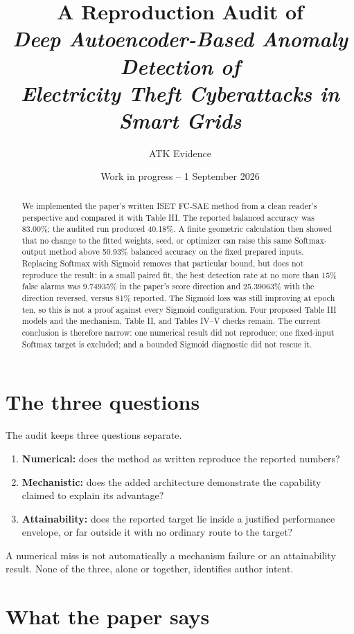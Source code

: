 \documentclass[11pt]{article}
\title{A Reproduction Audit of\\
\emph{Deep Autoencoder-Based Anomaly Detection of\\
Electricity Theft Cyberattacks in Smart Grids}}
\author{ATK Evidence}
\date{Work in progress -- 1 September 2026}
\begin{document}
\maketitle

\begin{abstract}
We implemented the paper's written ISET FC-SAE method from a clean reader's
perspective and compared it with Table III. The reported balanced accuracy was
83.00\%; the audited run produced 40.18\%. A finite geometric calculation then
showed that no change to the fitted weights, seed, or optimizer can raise this
same Softmax-output method above 50.93\% balanced accuracy on the fixed prepared
inputs. Replacing Softmax with Sigmoid removes that particular bound, but does
not reproduce the result: in a small paired fit, the best detection rate at no
more than 15\% false alarms was 9.74935\% in the paper's score direction and
25.39063\% with the direction reversed, versus 81\% reported. The Sigmoid loss
was still improving at epoch ten, so this is not a proof against every Sigmoid
configuration. Four proposed Table III models and the mechanism, Table II, and
Tables IV--V checks remain. The current conclusion is therefore narrow: one
numerical result did not reproduce; one fixed-input Softmax target is excluded;
and a bounded Sigmoid diagnostic did not rescue it.
\end{abstract}

\section{The three questions}

The audit keeps three questions separate.

\begin{enumerate}
  \item \textbf{Numerical:} does the method as written reproduce the reported
  numbers?
  \item \textbf{Mechanistic:} does the added architecture demonstrate the
  capability claimed to explain its advantage?
  \item \textbf{Attainability:} does the reported target lie inside a justified
  performance envelope, or far outside it with no ordinary route to the target?
\end{enumerate}

A numerical miss is not automatically a mechanism failure or an attainability
result. None of the three, alone or together, identifies author intent.

\section{What the paper says}
\end{document}
